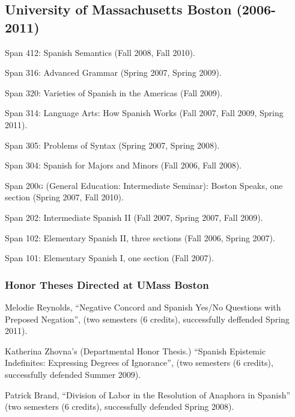 \documentclass[11pt]{article}
\begin{document}
\subsection*{University of Massachusetts Boston (2006-2011)}


Span 412: Spanish Semantics (Fall 2008, Fall 2010).

Span 316: Advanced Grammar (Spring 2007, Spring 2009).

Span 320: Varieties of Spanish in the Americas (Fall 2009).

Span 314: Language Arts: How Spanish Works (Fall 2007, Fall 2009,
Spring 2011).

Span 305: Problems of Syntax (Spring 2007, Spring 2008).

Span 304: Spanish for Majors and Minors (Fall 2006, Fall 2008).

Span 200\textsc{g} (General Education: Intermediate Seminar): Boston
Speaks, one section (Spring 2007, Fall 2010).

Span 202: Intermediate Spanish II  (Fall 2007, Spring 2007, Fall
2009).

Span 102: Elementary Spanish II,  three sections (Fall 2006, Spring
2007).

Span 101: Elementary Spanish I, one section (Fall 2007).	

 \subsubsection*{Honor Theses Directed at UMass Boston}

 Melodie Reynolds, ``Negative Concord and
Spanish Yes/No Questions with Preposed Negation'', (two semesters (6
credits), successfully deffended Spring 2011).

 Katherina Zhovna's (Departmental Honor
  Thesis.)  ``Spanish Epistemic Indefinites: Expressing
  Degrees of Ignorance'', (two semesters (6 credits), successfully defended Summer 2009).

 Patrick Brand, ``Division of
  Labor in the Resolution of Anaphora in Spanish''  (two semesters (6 credits), successfully
  defended Spring 2008).




\end{document}
